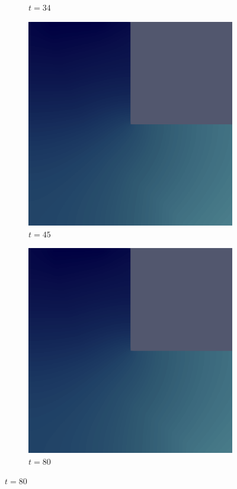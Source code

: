 \begin{figure}[H]
\begin{subfigure}{.4\textwidth}
        \caption{$t = 34$}
    \end{subfigure}
    \begin{subfigure}{.4\textwidth}
        \includegraphics[width=\textwidth]{imgs/LShapeSource_Solution/seventh.png}
        \caption{$t = 45$}
    \end{subfigure}
    \begin{subfigure}{.4\textwidth}
        \includegraphics[width=\textwidth]{imgs/LShapeSource_Solution/eighth.png}
        \caption{$t = 80$}
    \end{subfigure}
\end{figure}

